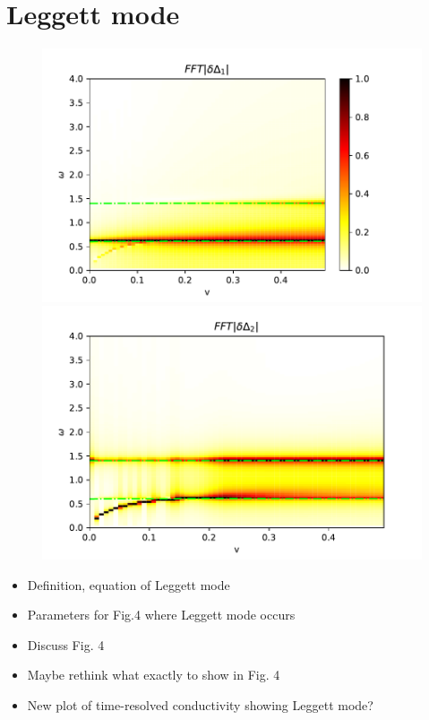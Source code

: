 \documentclass[aps,prb,reprint,noeprint,superscriptaddress]{revtex4-1}
\begin{document}
\section{Leggett mode}
\label{sec:leggett_mode}
\begin{figure}[ht]
  \centering
  \includegraphics[width=\columnwidth]{figures/2_a}
  \includegraphics[width=\columnwidth]{figures/2_b}
\end{figure}

\begin{itemize}
	\item Definition, equation of Leggett mode
	\item Parameters for Fig.4 where Leggett mode occurs
	\item Discuss Fig. 4
	\item Maybe rethink what exactly to show in Fig. 4
	\item New plot of time-resolved conductivity showing Leggett mode?
\end{itemize}
 
\end{document}

